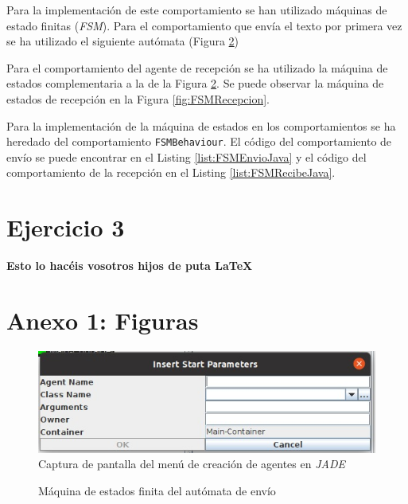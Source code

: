 \documentclass[10pt,a4paper]{article}
\begin{document}
Para la implementación de este comportamiento se han utilizado máquinas de estado finitas (\emph{FSM}). Para el comportamiento que envía el texto por primera vez se ha utilizado el siguiente autómata (Figura \ref{fig:FSMEnvio})

Para el comportamiento del agente de recepción se ha utilizado la máquina de estados complementaria a la de la Figura \ref{fig:FSMEnvio}. Se puede observar la máquina de estados de recepción en la Figura \ref{fig:FSMRecepcion}.

Para la implementación de la máquina de estados en los comportamientos se ha heredado del comportamiento \texttt{FSMBehaviour}. El código del comportamiento de envío se puede encontrar en el Listing \ref{list:FSMEnvioJava} y el código del comportamiento de la recepción en el Listing \ref{list:FSMRecibeJava}.


\section{Ejercicio 3}

\textbf{Esto lo hacéis vosotros hijos de puta \LaTeX}

\newpage
\section{Anexo 1: Figuras}

\begin{figure}[h!]
\centering
\includegraphics[scale=0.5]{images/arguments.jpeg}
\caption{Captura de pantalla del menú de creación de agentes en \emph{JADE}}
\label{fig:creacionAgente}
\end{figure}

\begin{figure}[h!]
\centering
\caption{Máquina de estados finita del autómata de envío}
\label{fig:FSMEnvio}
\end{figure}
\end{document}

